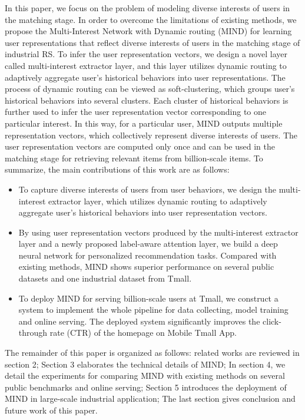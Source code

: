 \documentclass[sigconf]{acmart}
\begin{document}
In this paper, we focus on the problem of modeling diverse interests of users in the matching stage.
In order to overcome the limitations of existing methods, we propose the Multi-Interest Network with Dynamic routing (MIND) for learning user representations that reflect diverse interests of users in the matching stage of industrial RS.
To infer the user representation vectors, we design a novel layer called multi-interest extractor layer, and this layer utilizes dynamic routing \cite{sabour2017dynamic} to adaptively aggregate user's historical behaviors into user representations.
The process of dynamic routing can be viewed as soft-clustering, which groups user’s historical behaviors into several clusters.
Each cluster of historical behaviors is further used to infer the user representation vector corresponding to one particular interest.
In this way, for a particular user, MIND outputs multiple representation vectors, which collectively represent diverse interests of users.
The user representation vectors are computed only once and can be used in the matching stage for retrieving relevant items from billion-scale items.
To summarize, the main contributions of this work are as follows:
\begin{itemize}
  \item To capture diverse interests of users from user behaviors, we design the multi-interest extractor layer, which utilizes dynamic routing to adaptively aggregate user's historical behaviors into user representation vectors.
  \item By using user representation vectors produced by the multi-interest extractor layer and a newly proposed label-aware attention layer, we build a deep neural network for personalized recommendation tasks. Compared with existing methods, MIND shows superior performance on several public datasets and one industrial dataset from Tmall.
  \item To deploy MIND for serving billion-scale users at Tmall, we construct a system to implement the whole pipeline for data collecting, model training and online serving. The deployed system significantly improves the click-through rate (CTR) of the homepage on Mobile Tmall App.
\end{itemize}
The remainder of this paper is organized as follows:
related works are reviewed in section 2;
Section 3 elaborates the technical details of MIND;
In section 4, we detail the experiments for comparing MIND with existing methods on several public benchmarks and online serving;
Section 5 introduces the deployment of MIND in large-scale industrial application;
The last section gives conclusion and future work of this paper.
\end{document}

